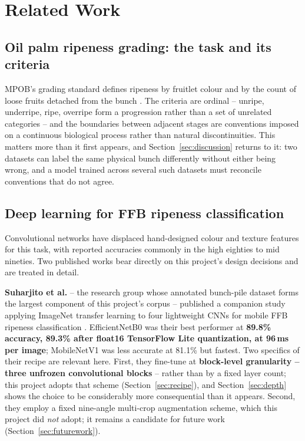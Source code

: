 \documentclass{article}
\begin{document}
\section{Related Work}
\label{sec:related}

\subsection{Oil palm ripeness grading: the task and its criteria}

MPOB's grading standard defines ripeness by fruitlet colour and by the count of loose fruits detached from
the bunch \citep{mpob2023grading}. The criteria are ordinal -- unripe, underripe, ripe, overripe form a
progression rather than a set of unrelated categories -- and the boundaries between adjacent stages are
conventions imposed on a continuous biological process rather than natural discontinuities. This matters
more than it first appears, and Section~\ref{sec:discussion} returns to it: two datasets can label the
same physical bunch differently without either being wrong, and a model trained across several such
datasets must reconcile conventions that do not agree.

\subsection{Deep learning for FFB ripeness classification}

Convolutional networks have displaced hand-designed colour and texture features for this task, with
reported accuracies commonly in the high eighties to mid nineties. Two published works bear directly on
this project's design decisions and are treated in detail.

\textbf{Suharjito et al.} -- the research group whose annotated bunch-pile dataset
\citep{suharjito2020bunchpiles} forms the largest component of this project's corpus -- published a
companion study applying ImageNet transfer learning to four lightweight CNNs for mobile FFB ripeness
classification \citep{suharjito2021mobile}. EfficientNetB0 was their best performer at \textbf{89.8\%
accuracy, 89.3\% after float16 TensorFlow Lite quantization, at 96\,ms per image}; MobileNetV1 was less
accurate at 81.1\% but fastest. Two specifics of their recipe are relevant here. First, they fine-tune at
\textbf{block-level granularity -- three unfrozen convolutional blocks} -- rather than by a fixed layer
count; this project adopts that scheme (Section~\ref{sec:recipe}), and Section~\ref{sec:depth} shows the
choice to be considerably more consequential than it appears. Second, they employ a fixed nine-angle
multi-crop augmentation scheme, which this project did \textit{not} adopt; it remains a candidate for
future work (Section~\ref{sec:futurework}).
\end{document}
